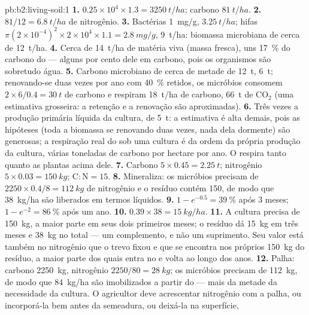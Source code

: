 \begin{solution}{pb:b2:living-soil:1}
\textbf{1.} $0.25\times 10^{4}\times 1.3 = \qty{3250}{t/ha}$;
carbono $\qty{81}{t/ha}$.
\textbf{2.} $81/12 = \qty{6.8}{t/ha}$ de nitrogênio.
\textbf{3.} Bactérias \qty{1}{mg/g}, $\qty{3.25}{t/ha}$; hifas
$\pi(2\times 10^{-4})^{2}\times 2\times 10^{4}\times 1.1 =
\qty{2.8}{mg/g}$, \qty{9}{t/ha}: biomassa microbiana de cerca de
\qty{12}{t/ha}.
\textbf{4.} Cerca de \qty{14}{t/ha} de matéria viva (massa fresca),
uns \qty{17}{\%} do carbono do  --- alguns por cento dele em
carbono, pois os organismos são sobretudo água.
\textbf{5.} Carbono microbiano de cerca de metade de \qty{12}{t},
\qty{6}{t}; renovando-se duas vezes por ano com \qty{40}{\%} retidos,
os micróbios consomem $2\times 6/0.4 = \qty{30}{t}$ de carbono e respiram
\qty{18}{t/ha} de carbono, \qty{66}{t} de $\mathrm{CO_2}$ (uma estimativa
grosseira: a retenção e a renovação são aproximadas).
\textbf{6.} Três vezes a produção primária líquida da cultura, de
\qty{5}{t}: a estimativa é alta demais, pois as hipóteses (toda a
biomassa se renovando duas vezes, nada dela dormente) são generosas; a
respiração real do  sob uma cultura é da ordem da própria produção
da cultura, várias toneladas de carbono por hectare por ano. O 
respira tanto quanto as plantas acima dele.
\textbf{7.} Carbono $5\times 0.45 = \qty{2.25}{t}$; nitrogênio $5\times
0.03 = \qty{150}{kg}$; $\mathrm{C:N} = 15$.
\textbf{8.} Mineraliza: os micróbios precisam de $2250\times 0.4/8 =
\qty{112}{kg}$ de nitrogênio e o resíduo contém 150, de modo que
\qty{38}{kg/ha} são liberados em termos líquidos.
\textbf{9.} $1 - e^{-0.5} = \qty{39}{\%}$ após 3 meses; $1 - e^{-2}
= \qty{86}{\%}$ após um ano.
\textbf{10.} $0.39\times 38 = \qty{15}{kg/ha}$.
\textbf{11.} A cultura precisa de \qty{150}{kg}, a maior parte em seus
dois primeiros meses; o resíduo dá \qty{15}{kg} em três meses e
\qty{38}{kg} no total --- um complemento, e não um suprimento. Seu valor
está também no nitrogênio que o trevo fixou e que se encontra nos
próprios \qty{150}{kg} do resíduo, a maior parte dos quais entra no
 e volta ao longo dos anos.
\textbf{12.} Palha: carbono \qty{2250}{kg}, nitrogênio $2250/80 =
\qty{28}{kg}$; os micróbios precisam de \qty{112}{kg}, de modo que
\qty{84}{kg/ha} são imobilizados a partir do  --- mais da metade da
necessidade da cultura. O agricultor deve acrescentar nitrogênio com a
palha, ou incorporá-la bem antes da semeadura, ou deixá-la na superfície,

\end{solution}
